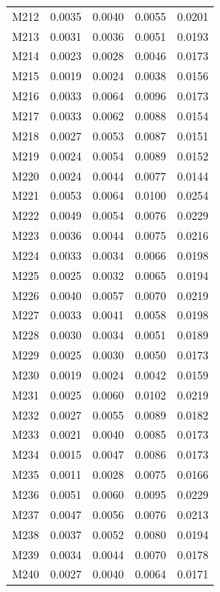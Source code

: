 \begin{longtable}{lrrrr}
M212 & 0.0035 & 0.0040 & 0.0055 & 0.0201 \\
M213 & 0.0031 & 0.0036 & 0.0051 & 0.0193 \\
M214 & 0.0023 & 0.0028 & 0.0046 & 0.0173 \\
M215 & 0.0019 & 0.0024 & 0.0038 & 0.0156 \\
M216 & 0.0033 & 0.0064 & 0.0096 & 0.0173 \\
M217 & 0.0033 & 0.0062 & 0.0088 & 0.0154 \\
M218 & 0.0027 & 0.0053 & 0.0087 & 0.0151 \\
M219 & 0.0024 & 0.0054 & 0.0089 & 0.0152 \\
M220 & 0.0024 & 0.0044 & 0.0077 & 0.0144 \\
M221 & 0.0053 & 0.0064 & 0.0100 & 0.0254 \\
M222 & 0.0049 & 0.0054 & 0.0076 & 0.0229 \\
M223 & 0.0036 & 0.0044 & 0.0075 & 0.0216 \\
M224 & 0.0033 & 0.0034 & 0.0066 & 0.0198 \\
M225 & 0.0025 & 0.0032 & 0.0065 & 0.0194 \\
M226 & 0.0040 & 0.0057 & 0.0070 & 0.0219 \\
M227 & 0.0033 & 0.0041 & 0.0058 & 0.0198 \\
M228 & 0.0030 & 0.0034 & 0.0051 & 0.0189 \\
M229 & 0.0025 & 0.0030 & 0.0050 & 0.0173 \\
M230 & 0.0019 & 0.0024 & 0.0042 & 0.0159 \\
M231 & 0.0025 & 0.0060 & 0.0102 & 0.0219 \\
M232 & 0.0027 & 0.0055 & 0.0089 & 0.0182 \\
M233 & 0.0021 & 0.0040 & 0.0085 & 0.0173 \\
M234 & 0.0015 & 0.0047 & 0.0086 & 0.0173 \\
M235 & 0.0011 & 0.0028 & 0.0075 & 0.0166 \\
M236 & 0.0051 & 0.0060 & 0.0095 & 0.0229 \\
M237 & 0.0047 & 0.0056 & 0.0076 & 0.0213 \\
M238 & 0.0037 & 0.0052 & 0.0080 & 0.0194 \\
M239 & 0.0034 & 0.0044 & 0.0070 & 0.0178 \\
M240 & 0.0027 & 0.0040 & 0.0064 & 0.0171 \\
\end{longtable}
